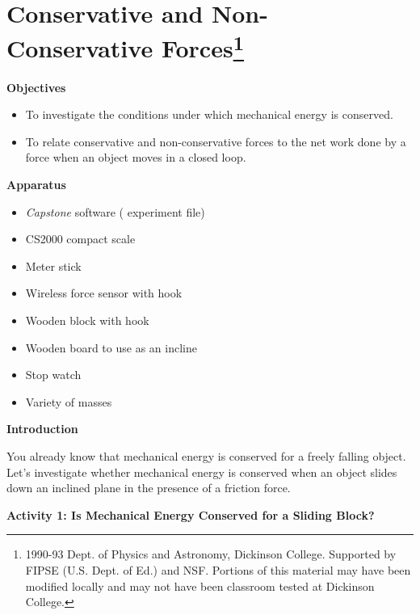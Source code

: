 
\section{Conservative and Non-Conservative Forces\footnote{
1990-93 Dept. of Physics and Astronomy, Dickinson College. Supported by FIPSE
(U.S. Dept. of Ed.) and NSF. Portions of this material may have been modified
locally and may not have been classroom tested at Dickinson College.
}}

\makelabheader %


\medskip
\textbf{Objectives} 

\begin{itemize}[nosep]
\item To investigate the conditions under which mechanical energy is conserved. 
\item To relate conservative and non-conservative forces to the net work done by a
force when an object moves in a closed loop.
\end{itemize}

\medskip
\textbf{Apparatus} 
\begin{itemize}[nosep]
\item \textit{Capstone} software ( experiment file)
\item CS2000 compact scale
\item Meter stick 
\item Wireless force sensor with hook
\item Wooden block with hook
\item Wooden board to use as an incline 
\item Stop watch
\item Variety of masses 

\end{itemize}

\textbf{Introduction }

You already know that mechanical energy is conserved
for a freely falling object. Let's investigate whether mechanical energy is
conserved when an object slides down an inclined plane in the presence of a
friction force.

\textbf{Activity 1: Is Mechanical Energy Conserved for a Sliding Block? }


